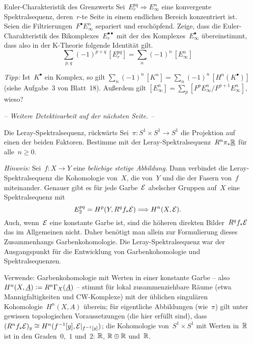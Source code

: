 \documentclass{uebblatt}
\begin{document}
\begin{aufgabe}{Euler-Charakteristik des Grenzwerts}
Sei~$E_r^{pq} \Rightarrow E^n_\infty$ eine konvergente Spektralsequenz,
deren~$r$-te Seite in einem endlichen Bereich konzentriert ist. Seien die
Filtrierungen~$F^\bullet E^n_\infty$ separiert und erschöpfend. Zeige, dass die
Euler-Charakteristik des Bikomplexes~$E_r^{\bullet\bullet}$ mit der des
Komplexes~$E_\infty^\bullet$ übereinstimmt, dass also in der K-Theorie folgende
Identität gilt.
\[ \sum_{p,q} (-1)^{p+q} \, [E_r^{pq}] = \sum_n (-1)^n \, [E_\infty^n] \]
{\tiny\emph{Tipp:} Ist~$K^\bullet$ ein Komplex, so gilt $\sum_n (-1)^n \, [K^n] =
\sum_n (-1)^n \, [H^n(K^\bullet)]$ (siehe Aufgabe~3 von Blatt~18). Außerdem gilt
$[E_\infty^n] = \sum_p [F^p E_\infty^n / F^{p+1} E_\infty^n]$, wieso?\par}
\end{aufgabe}

\begin{center}\emph{-- Weitere Detektivarbeit auf der nächsten Seite.
--}\end{center}
\newpage

\begin{aufgabe}{Die Leray-Spektralsequenz, rückwärts}
Sei~$\pi : S^1 \times S^1 \to S^1$ die Projektion auf einen der beiden
Faktoren. Bestimme mit der Leray-Spektralsequenz~$R^n \pi_* \underline{\mathbb{R}}$ für alle~$n
\geq 0$.

{\tiny\emph{Hinweis:}
Sei~$f : X \to Y$ eine \emph{beliebige stetige Abbildung}. Dann verbindet die
Leray-Spektralsequenz die Kohomologie von~$X$,
die von~$Y$ und die der Fasern von~$f$ miteinander. Genauer gibt es für jede
Garbe~$\mathcal{E}$ abelscher Gruppen auf~$X$ eine Spektralsequenz mit
\[ E_2^{pq} = H^p(Y, R^q f_* \mathcal{E}) \Longrightarrow H^n(X, \mathcal{E}). \]
Auch, wenn~$\mathcal{E}$ eine konstante Garbe ist, sind die höheren direkten Bilder~$R^q
f_* \mathcal{E}$ das im Allgemeinen nicht. Daher benötigt man allein zur Formulierung
dieses Zusammenhangs Garbenkohomologie. Die Leray-Spektralsequenz war der
Ausgangspunkt für die Entwicklung von Garbenkohomologie und
Spektralsequenzen.\par Verwende: Garbenkohomologie mit Werten in einer
konstante Garbe -- also $H^n(X, \underline{A}) \vcentcolon= R^n \Gamma_X(\underline{A})$ -- stimmt
für lokal zusammenziehbare Räume (etwa Mannigfaltigkeiten und CW-Komplexe) mit
der üblichen singulären Kohomologie~$H^n(X, A)$ überein; für eigentliche
Abbildungen (wie~$\pi$) gilt unter gewissen topologischen Voraussetzungen (die
hier erfüllt sind), dass~$(R^n f_* \mathcal{E})_y \cong H^n(f^{-1}[y],
\mathcal{E}|_{f^{-1}[y]})$; die Kohomologie von~$S^1 \times S^1$ mit Werten in~$\mathbb{R}$
ist in den Graden~$0$,~$1$ und~$2$: $\mathbb{R}$, $\mathbb{R} \oplus \mathbb{R}$ und~$\mathbb{R}$.\par}
\end{aufgabe}
\end{document}
